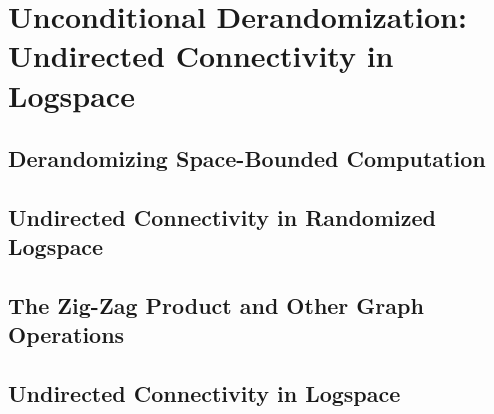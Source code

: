 \chapter{Unconditional Derandomization: Undirected Connectivity in Logspace}
\label{lec:14}

\section{Derandomizing Space-Bounded Computation}

\section{Undirected Connectivity in Randomized Logspace}

\section{The Zig-Zag Product and Other Graph Operations}

\section{Undirected Connectivity in Logspace}
